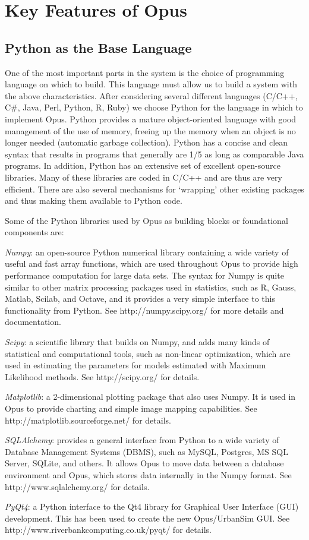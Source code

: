 \section{Key Features of Opus}
\subsection{Python as the Base Language}
One of the most important parts in the system is the choice of programming language on which to build.  This language must allow us to build a system with the above characteristics.  
After considering several different languages (C/C++, C\#, Java, Perl, Python, R, Ruby) we choose Python for the language in which to implement Opus. Python provides a mature object-oriented language with good management of the use of memory, freeing up the memory when an object is no longer needed (automatic garbage collection).  Python has a concise and clean syntax that results in programs that generally are 1/5 as long as comparable Java programs.  In addition, Python has an extensive set of excellent open-source libraries.  Many of these libraries are coded in C/C++ and are thus are very efficient.  There are also several mechanisms for `wrapping' other existing packages and thus making them available to Python code.  

Some  of the Python libraries used by Opus as building blocks or foundational components are:
\squishlist
\item \emph{Numpy}: an open-source Python numerical library containing a wide variety of useful and fast array functions, which are used throughout Opus to provide high performance computation for large data sets.  The syntax for Numpy is quite similar to other matrix processing packages used in statistics, such as R, Gauss, Matlab, Scilab, and Octave, and it provides a very simple interface to this functionality from Python.  See http://numpy.scipy.org/ for more details and documentation.
\item \emph{Scipy}: a scientific library that builds on Numpy, and adds many kinds of statistical and computational tools, such as non-linear optimization, which are used in estimating the parameters for models estimated with Maximum Likelihood methods.  See http://scipy.org/ for details.
\item \emph{Matplotlib}: a 2-dimensional plotting package that also uses Numpy.  It is used in Opus to provide charting and simple image mapping capabilities.  See http://matplotlib.sourceforge.net/ for details.
\item \emph{SQLAlchemy}: provides a general interface from Python to a wide variety of Database Management Systems (DBMS), such as MySQL, Postgres, MS SQL Server, SQLite, and others.  It allows Opus to move data between a database environment and Opus, which stores data internally in the Numpy format.  See http://www.sqlalchemy.org/ for details.
\item \emph{PyQt4}: a Python interface to the Qt4 library for Graphical User Interface (GUI) development.  This has been used to create the new Opus/UrbanSim GUI.  See http://www.riverbankcomputing.co.uk/pyqt/ for details.
\squishend

